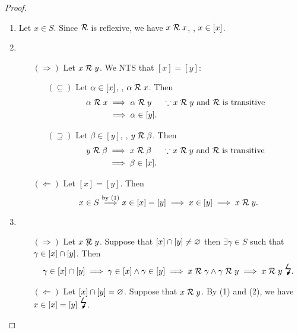 \documentclass[11pt,openany]{article}
\begin{document}
\begin{proof}
	\begin{enumerate}[(1)]
		\item Let $x\in S$. Since $\mathcal{R}$ is reflexive, we have $x\mathrel{\mathcal{R}} x$, \ie, $x\in\left[x\right]$.
		\item \begin{itemize}
			\item[$(\Rightarrow)$] Let $x\mathrel{\mathcal{R}} y$. We NTS that $[x]=[y]$: \begin{itemize}
				\item[$(\subseteq)$] Let $\alpha\in\left[x\right]$, \ie, $\alpha\mathrel{\mathcal{R}} x$. Then 
				\begin{align*}
					\alpha\mathrel{\mathcal{R}} x&\implies \alpha\mathrel{\mathcal{R}} y&\because\text{$x\mathrel{\mathcal{R}} y$ and $\mathcal{R}$ is transitive} \\
					&\implies \alpha\in[y].
				\end{align*}
				\item[$(\supseteq)$] Let $\beta\in[y]$, \ie, $y\mathrel{\mathcal{R}}\beta$. Then 
				\begin{align*}
					y\mathrel{\mathcal{R}}\beta&\implies x\mathrel{\mathcal{R}} \beta&\because\text{$x\mathrel{\mathcal{R}} y$ and $\mathcal{R}$ is transitive} \\
					&\implies \beta\in[x].
				\end{align*}
			\end{itemize}
			\item[$(\Leftarrow)$] Let $[x]=[y]$. Then \[
			x\in S\overset{\text{by (1)}}{\implies} x\in[x]=[y]\implies x\in[y]\implies x\mathrel{\mathcal{R}} y.
			\]
		\end{itemize}
		\item \begin{itemize}
			\item[$(\Rightarrow)$] Let $x\centernot\relation y$. Suppose that $\left[x\right]\cap[y]\neq\varnothing$ then $\exists \gamma\in S$ such that $\gamma\in\left[x\right]\cap[y]$. Then \begin{align*}
				\gamma\in [x]\cap [y]\implies \gamma\in [x]\land\gamma\in [y]\implies x\relation\gamma\land \gamma\relation y\implies x\relation y\ \text{\LARGE\lightning}.
			\end{align*}
			\item[$(\Leftarrow)$] Let $\left[x\right]\cap[y]=\varnothing$. Suppose that $x\mathrel{\mathcal{R}} y$. By (1) and (2), we have $x\in[x]=[y]\ \text{\LARGE\lightning}$.
		\end{itemize}
	\end{enumerate}
\end{proof}
\begin{center}

\end{center}
\end{document}
